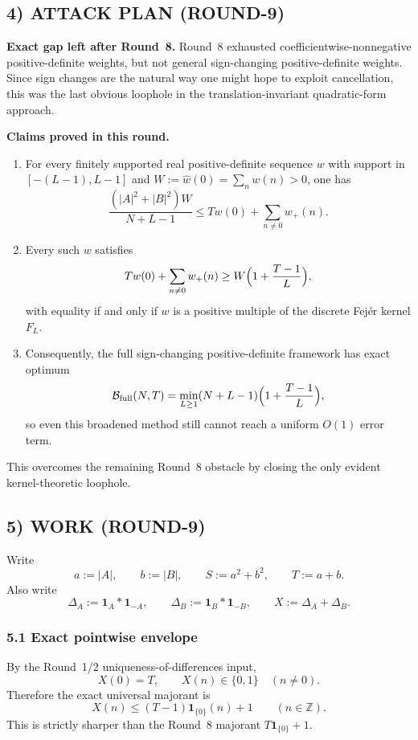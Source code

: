 \subsection{4) ATTACK PLAN (ROUND-9)}

\textbf{Exact gap left after Round~8.}
Round~8 exhausted coefficientwise-nonnegative positive-definite weights, but not general sign-changing positive-definite weights.  Since sign changes are the natural way one might hope to exploit cancellation, this was the last obvious loophole in the translation-invariant quadratic-form approach.

\textbf{Claims proved in this round.}
\begin{enumerate}
\item For every finitely supported real positive-definite sequence \(w\) with support in \([-(L-1),L-1]\) and \(W:=\widehat w(0)=\sum_n w(n)>0\), one has
\[
\frac{(|A|^2+|B|^2)W}{N+L-1}
\le T w(0)+\sum_{n\ne 0} w_+(n).
\]
\item Every such \(w\) satisfies
\[
T w(0)+\sum_{n\ne 0} w_+(n)
\ge W\Bigl(1+\frac{T-1}{L}\Bigr),
\]
with equality if and only if \(w\) is a positive multiple of the discrete Fej\'er kernel \(F_L\).
\item Consequently, the full sign-changing positive-definite framework has exact optimum
\[
\mathcal B_{\mathrm{full}}(N,T)
=
\min_{L\ge 1}(N+L-1)\Bigl(1+\frac{T-1}{L}\Bigr),
\]
so even this broadened method still cannot reach a uniform \(O(1)\) error term.
\end{enumerate}

This overcomes the remaining Round~8 obstacle by closing the only evident kernel-theoretic loophole.

\subsection{5) WORK (ROUND-9)}

Write
\[
a:=|A|,\qquad b:=|B|,\qquad S:=a^2+b^2,\qquad T:=a+b.
\]
Also write
\[
\Delta_A:=\mathbf 1_A*\mathbf 1_{-A},\qquad \Delta_B:=\mathbf 1_B*\mathbf 1_{-B},\qquad X:=\Delta_A+\Delta_B.
\]

\subsubsection{5.1 Exact pointwise envelope}

By the Round~1/2 uniqueness-of-differences input,
\[
X(0)=T,
\qquad
X(n)\in\{0,1\}\quad (n\ne 0).
\]
Therefore the exact universal majorant is
\begin{equation}
\label{eq:r9-pointwise}
X(n)\le (T-1)\mathbf 1_{\{0\}}(n)+1
\qquad (n\in\mathbb Z).
\end{equation}
This is strictly sharper than the Round~8 majorant \(T\mathbf 1_{\{0\}}+1\).

